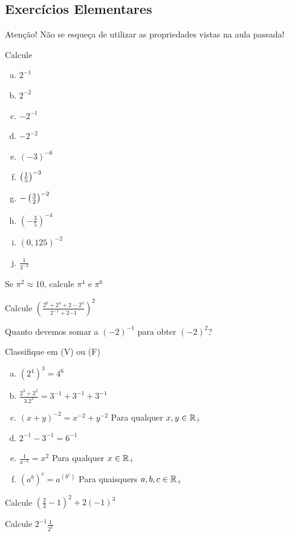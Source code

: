 \subsection*{Exercícios Elementares}
Atenção! Não se esqueça de utilizar as propriedades vistas na aula passada!
\begin{exer}Calcule
\begin{enumerate}[a)]
\item $2^{-1}$
\item $2^{-2}$
\item $-2^{-1}$
\item $-2^{-2}$
\item $(-3)^{-6}$
\item $\left ( \frac{1}{5} \right)^{-3}$
\item $-\left ( \frac{3}{2} \right)^{-2} $
\item $\left(-\frac{3}{5} \right)^{-4}$
\item $(0,125)^{-2}$
\item $\frac{1}{3^{-2}}$
\end{enumerate}
\end{exer}
\begin{exer} Se $\pi^2 \approx 10$, calcule $\pi^4$ e $\pi^6$
\end{exer}
\begin{exer} Calcule $\left ( \frac{2^0 + 2^4 + 2 - 2^3}{2^{-1}+2{-1}} \right)^2$
\end{exer}
\begin{exer}
Quanto devemos somar a $(-2)^{-1}$ para obter $(-2)^2$?
\end{exer}
\begin{exer} Classifique em (V) ou (F)
\begin{enumerate}[a)]
\item $(2^4)^3 = 4^6$
\item $\frac{2^3+2^2}{3.2^2} = 3^{-1}+3^{-1}+3^{-1}$
\item $(x+y)^{-2} = x^{-2}+y^{-2}$ Para qualquer $x,y \in \mathbb{R}_+$
\item $2^{-1}-3^{-1}=6^{-1}$
\item $\frac{1}{x^{-2}} = x^2$ Para qualquer $x \in \mathbb{R}_+$
\item $(a^b)^c = a^{(b^c)}$ Para quaisquers $a,b,c \in \mathbb{R}_+$
\end{enumerate}
\end{exer}
\begin{exer}[PM]Calcule $\left(\frac{2}{3}-1\right)^2+2(-1)^3$
\end{exer}
\begin{exer}[PM]Calcule $2^{-1}\frac{1}{2^5}$
\end{exer}
